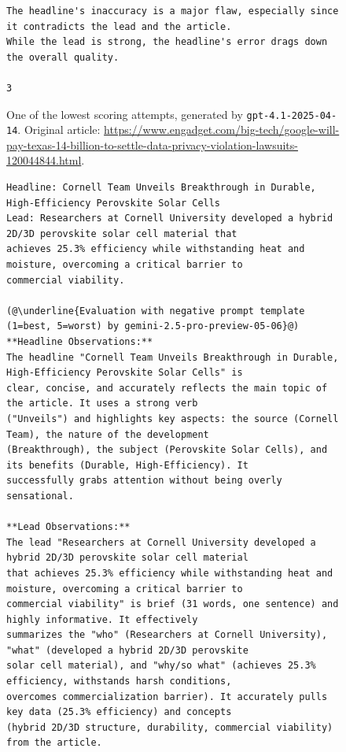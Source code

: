 \documentclass[UTF8,noindent,nohyp,parspace,titlepage,a4paper,12pt]{article}
\begin{document}
\begin{figure}[!hbtp]
\begin{lstlisting}[basicstyle=\fontsize{7pt}{8pt}\selectfont\sffamily,frame=single,linewidth=\textwidth]
The headline's inaccuracy is a major flaw, especially since it contradicts the lead and the article.
While the lead is strong, the headline's error drags down the overall quality.

3
      \end{lstlisting}
      \caption{%
        One of the lowest scoring attempts, generated by
        \texttt{gpt-4.1-2025-04-14}. Original article:
        {\footnotesize\url{https://www.engadget.com/big-tech/google-will-pay-texas-14-billion-to-settle-data-privacy-violation-lawsuits-120044844.html}}.
      }
    \end{figure}

    \begin{figure}[!hbtp]
      \begin{lstlisting}[basicstyle=\fontsize{7pt}{8pt}\selectfont\sffamily,frame=single,linewidth=\textwidth]
Headline: Cornell Team Unveils Breakthrough in Durable, High-Efficiency Perovskite Solar Cells
Lead: Researchers at Cornell University developed a hybrid 2D/3D perovskite solar cell material that
achieves 25.3% efficiency while withstanding heat and moisture, overcoming a critical barrier to
commercial viability.

(@\underline{Evaluation with negative prompt template (1=best, 5=worst) by gemini-2.5-pro-preview-05-06}@)
**Headline Observations:**
The headline "Cornell Team Unveils Breakthrough in Durable, High-Efficiency Perovskite Solar Cells" is
clear, concise, and accurately reflects the main topic of the article. It uses a strong verb
("Unveils") and highlights key aspects: the source (Cornell Team), the nature of the development
(Breakthrough), the subject (Perovskite Solar Cells), and its benefits (Durable, High-Efficiency). It
successfully grabs attention without being overly sensational.

**Lead Observations:**
The lead "Researchers at Cornell University developed a hybrid 2D/3D perovskite solar cell material
that achieves 25.3% efficiency while withstanding heat and moisture, overcoming a critical barrier to
commercial viability" is brief (31 words, one sentence) and highly informative. It effectively
summarizes the "who" (Researchers at Cornell University), "what" (developed a hybrid 2D/3D perovskite
solar cell material), and "why/so what" (achieves 25.3% efficiency, withstands harsh conditions,
overcomes commercialization barrier). It accurately pulls key data (25.3% efficiency) and concepts
(hybrid 2D/3D structure, durability, commercial viability) from the article.


\end{lstlisting}
\end{figure}
\end{document}
